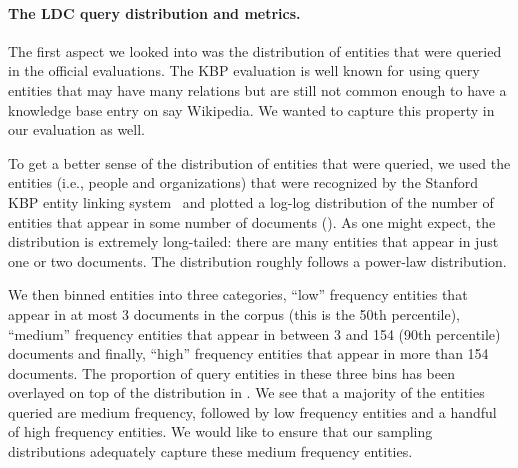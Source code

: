 \paragraph{The LDC query distribution and metrics.}
The first aspect we looked into was the distribution of entities that were queried in the official evaluations. 
The KBP evaluation is well known for using query entities that may have many relations but are still not common enough to have a knowledge base entry on say Wikipedia.
We wanted to capture this property in our evaluation as well.

To get a better sense of the distribution of entities that were queried, we used the entities (i.e., people and organizations) that were recognized by the Stanford KBP entity linking system~\citet{stanford2017kbp} and plotted a log-log distribution of the number of entities that appear in some number of documents ().
As one might expect, the distribution is extremely long-tailed: there are many entities that appear in just one or two documents. 
The distribution roughly follows a power-law distribution.

We then binned entities into three categories, ``low'' frequency entities that appear in at most 3 documents in the corpus (this is the 50th percentile), ``medium'' frequency entities that appear in between 3 and 154 (90th percentile) documents and finally, ``high'' frequency entities that appear in more than 154 documents.
The proportion of query entities in these three bins has been overlayed on top of the distribution in .
We see that a majority of the entities queried are medium frequency, followed by low frequency entities and a handful of high frequency entities.
We would like to ensure that our sampling distributions adequately capture these medium frequency entities. 

